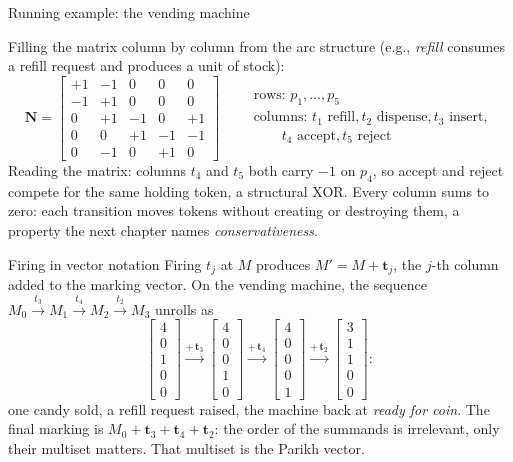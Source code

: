 \begin{examplebox}{Running example: the vending machine}
\begin{center}
\end{center}
Filling the matrix column by column from the arc structure (e.g., \emph{refill} consumes a refill request and produces a unit of stock):
\[
\mathbf{N} = \begin{bmatrix}
+1 & -1 & 0 & 0 & 0 \\
-1 & +1 & 0 & 0 & 0 \\
 0 & +1 & -1 & 0 & +1 \\
 0 &  0 & +1 & -1 & -1 \\
 0 & -1 & 0 & +1 & 0
\end{bmatrix}
\qquad
\begin{array}{l}
\text{rows: } p_1, \ldots, p_5 \\
\text{columns: } t_1 \text{ refill}, t_2 \text{ dispense}, t_3 \text{ insert}, \\
\qquad t_4 \text{ accept}, t_5 \text{ reject}
\end{array}
\]
Reading the matrix: columns $t_4$ and $t_5$ both carry $-1$ on $p_4$, so accept and reject compete for the same holding token, a structural XOR. Every column sums to zero: each transition moves tokens without creating or destroying them, a property the next chapter names \emph{conservativeness}.
\end{examplebox}

\begin{definitionbox}{Firing in vector notation}
Firing $t_j$ at $M$ produces $M' = M + \mathbf{t}_j$, the $j$-th column added to the marking vector. On the vending machine, the sequence $M_0 \xrightarrow{t_3} M_1 \xrightarrow{t_4} M_2 \xrightarrow{t_2} M_3$ unrolls as
\[
\begin{bmatrix} 4 \\ 0 \\ 1 \\ 0 \\ 0 \end{bmatrix}
\xrightarrow{+\,\mathbf{t}_3}
\begin{bmatrix} 4 \\ 0 \\ 0 \\ 1 \\ 0 \end{bmatrix}
\xrightarrow{+\,\mathbf{t}_4}
\begin{bmatrix} 4 \\ 0 \\ 0 \\ 0 \\ 1 \end{bmatrix}
\xrightarrow{+\,\mathbf{t}_2}
\begin{bmatrix} 3 \\ 1 \\ 1 \\ 0 \\ 0 \end{bmatrix}:
\]
one candy sold, a refill request raised, the machine back at \emph{ready for coin}. The final marking is $M_0 + \mathbf{t}_3 + \mathbf{t}_4 + \mathbf{t}_2$: the order of the summands is irrelevant, only their multiset matters. That multiset is the Parikh vector.
\end{definitionbox}

